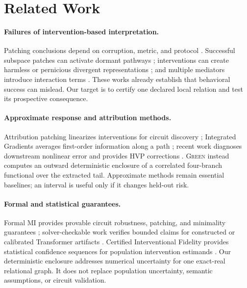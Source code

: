 \documentclass{article}
\newcommand{\green}{\textsc{Green}}
\begin{document}
\section{Related Work}
\label{sec:related}

\paragraph{Failures of intervention-based interpretation.}
Patching conclusions depend on corruption, metric, and protocol \citep{zhang2024best}. Successful subspace patches can activate dormant pathways \citep{makelov2024illusion}; interventions can create harmless or pernicious divergent representations \citep{grant2026addressing}; and multiple mediators introduce interaction terms \citep{vaidyanathan2026mediators}. These works already establish that behavioral success can mislead. Our target is to certify one declared local relation and test its prospective consequence.

\paragraph{Approximate response and attribution methods.}
Attribution patching linearizes interventions for circuit discovery \citep{syed2023attribution}; Integrated Gradients averages first-order information along a path \citep{sundararajan2017axiomatic}; recent work diagnoses downstream nonlinear error and provides HVP corrections \citep{zhang2026attribution}. \green{} instead computes an outward deterministic enclosure of a correlated four-branch functional over the extracted tail. Approximate methods remain essential baselines; an interval is useful only if it changes held-out risk.

\paragraph{Formal and statistical guarantees.}
Formal MI provides provable circuit robustness, patching, and minimality guarantees \citep{hadad2026formal}; solver-checkable work verifies bounded claims for constructed or calibrated Transformer artifacts \citep{somani2026verifiable}. Certified Interventional Fidelity provides statistical confidence sequences for population intervention estimands \citep{asiaee2026certified}. Our deterministic enclosure addresses numerical uncertainty for one exact-real relational graph. It does not replace population uncertainty, semantic assumptions, or circuit validation.
\end{document}
